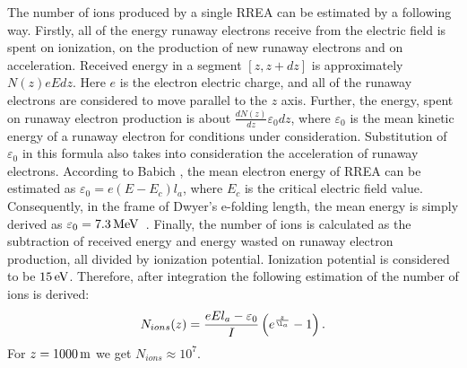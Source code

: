 \documentclass[doublecol,linenumbers]{epl2} %
\begin{document}
    The number of ions produced by a single RREA can be estimated by a following way. Firstly, all of the energy runaway electrons receive from the electric field is spent on ionization, on the production of new runaway electrons and on acceleration. Received energy in a segment $[z, z + dz]$ is approximately $N(z) e E d z$. Here $e$ is the electron electric charge, and all of the runaway electrons are considered to move parallel to the $z$ axis. Further, the energy, spent on runaway electron production is about $\frac{d N(z)}{d z} \varepsilon_{0} d z$, where $\varepsilon_{0}$ is the mean kinetic energy of a runaway electron for conditions under consideration. Substitution of $\varepsilon_0$ in this formula also takes into consideration the acceleration of runaway electrons. According to Babich \cite{Babich2001}, the mean electron energy of RREA can be estimated as $\varepsilon_0 = e(E - E_c) l_a$, where $E_c$ is the critical electric field value. Consequently, in the frame of Dwyer's e-folding length, the mean energy is simply derived as $\varepsilon_0 = 7.3\un{MeV}$~\cite{Dwyer2007}. Finally, the number of ions is calculated as the subtraction of received energy and energy wasted on runaway electron production, all divided by ionization potential. Ionization potential is considered to be $15\un{eV}$. Therefore, after integration the following estimation of the number of ions is derived:
    \begin{equation}
    N_{ions}(z) = \frac{e E l_a - \varepsilon_0}{I} \left( e^{\frac{z}{\l_a}} - 1\right).
    \end{equation}
    For $z = 1000\un{m}$ we get $N_{ions} \approx 10^7$.
    
\end{document}
